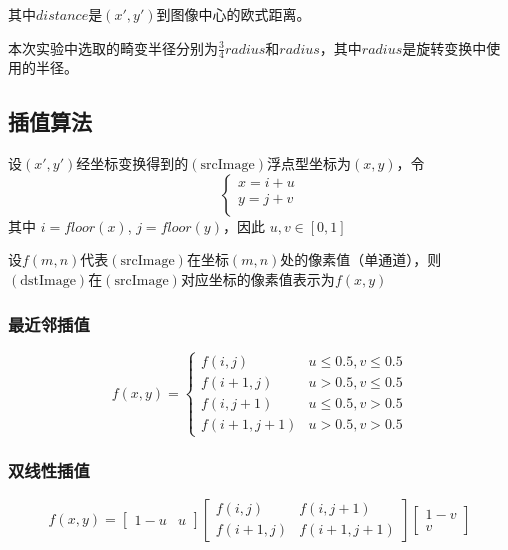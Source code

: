 \documentclass{article}
\begin{document}
其中$distance$是$(x',y')$到图像中心的欧式距离。

本次实验中选取的畸变半径分别为$\frac{3}{4}radius$和$radius$，其中$radius$是旋转变换中使用的半径。

\subsection{插值算法}
设$(x',y')$经坐标变换得到的$\mathrm{(srcImage)}$浮点型坐标为$(x,y)$，令
\begin{equation}
	\left\{
		\begin{aligned}
			x = i + u\\
			y = j + v\\
		\end{aligned}
	\right.
\end{equation}
其中 $i = floor(x)$, $j = floor(y)$，因此 $ u,v \in [0,1] $

设$f(m,n)$代表$\mathrm{(srcImage)}$在坐标$(m,n)$处的像素值（单通道），则$\mathrm{(dstImage)}$在$\mathrm{(srcImage)}$对应坐标的像素值表示为$f(x,y)$

\subsubsection{最近邻插值}
\begin{equation}
	f(x,y)=
	\begin{cases}
		f(i,j) & u \leqslant 0.5, v \leqslant 0.5\\
		f(i + 1,j) & u > 0.5, v \leqslant 0.5\\
		f(i,j + 1) & u \leqslant 0.5, v > 0.5\\
		f(i + 1,j + 1) & u > 0.5, v > 0.5
	\end{cases}
\end{equation}

\subsubsection{双线性插值}
\begin{equation}
	f(x,y)=
	\begin{bmatrix} 
		1-u & u
	\end{bmatrix}
	\begin{bmatrix} 
		f(i,j) & f(i,j+1) \\
		f(i+1,j) & f(i+1,j+1)
	\end{bmatrix}
	\begin{bmatrix} 
		1-v \\ v
	\end{bmatrix}
\end{equation}
\end{document}
